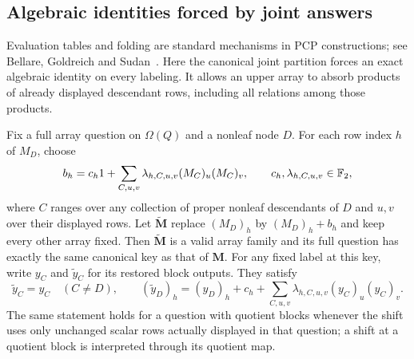 \subsection{Algebraic identities forced by joint answers}

Evaluation tables and folding are standard mechanisms in PCP constructions;
see Bellare, Goldreich and Sudan~\cite[Section~3.3]{BellareGoldreichSudan1998}.
Here the canonical joint partition forces an exact algebraic identity on
every labeling.  It allows an upper array to absorb products of already
displayed descendant rows, including all relations among those products.

\begin{lemma}\label{lem:folding}
Fix a full array question on $\Omega(Q)$ and a nonleaf node $D$.
For each row index $h$ of $M_D$, choose
\begin{equation}\label{eq:folding-shift}
 b_h=c_h1+
   \sum_{C,u,v}\lambda_{h,C,u,v}
              (M_C)_u(M_C)_v,
 \qquad c_h,\lambda_{h,C,u,v}\in\mathbb F_2,
\end{equation}
where $C$ ranges over any collection of proper nonleaf descendants of $D$
and $u,v$ over their displayed rows.  Let $\widetilde{\mathbf M}$ replace
$(M_D)_h$ by $(M_D)_h+b_h$ and keep every other array fixed.
Then $\widetilde{\mathbf M}$ is a valid array family and its full question
has exactly the same canonical key as that of $\mathbf M$.
For any fixed label at this key, write $y_C$ and $\widetilde y_C$ for
its restored block outputs.  They satisfy
\begin{equation}\label{eq:folding-output}
 \widetilde y_C=y_C\quad(C\neq D),\qquad
 (\widetilde y_D)_h=(y_D)_h+c_h+
   \sum_{C,u,v}\lambda_{h,C,u,v}(y_C)_u(y_C)_v.
\end{equation}
The same statement holds for a question with quotient blocks whenever
the shift uses only unchanged scalar rows actually displayed in that
question; a shift at a quotient block is interpreted through its quotient
map.
\end{lemma}
